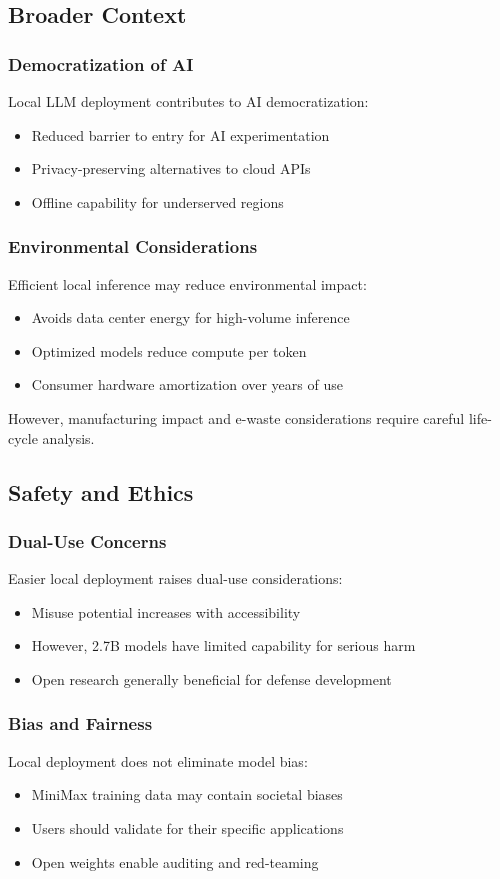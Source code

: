 \subsection{Broader Context}

\subsubsection{Democratization of AI}

Local LLM deployment contributes to AI democratization:

\begin{itemize}
    \item Reduced barrier to entry for AI experimentation
    \item Privacy-preserving alternatives to cloud APIs
    \item Offline capability for underserved regions
\end{itemize}

\subsubsection{Environmental Considerations}

Efficient local inference may reduce environmental impact:

\begin{itemize}
    \item Avoids data center energy for high-volume inference
    \item Optimized models reduce compute per token
    \item Consumer hardware amortization over years of use
\end{itemize}

However, manufacturing impact and e-waste considerations require careful life-cycle analysis.

\subsection{Safety and Ethics}

\subsubsection{Dual-Use Concerns}

Easier local deployment raises dual-use considerations:

\begin{itemize}
    \item Misuse potential increases with accessibility
    \item However, 2.7B models have limited capability for serious harm
    \item Open research generally beneficial for defense development
\end{itemize}

\subsubsection{Bias and Fairness}

Local deployment does not eliminate model bias:

\begin{itemize}
    \item MiniMax training data may contain societal biases
    \item Users should validate for their specific applications
    \item Open weights enable auditing and red-teaming
\end{itemize}
